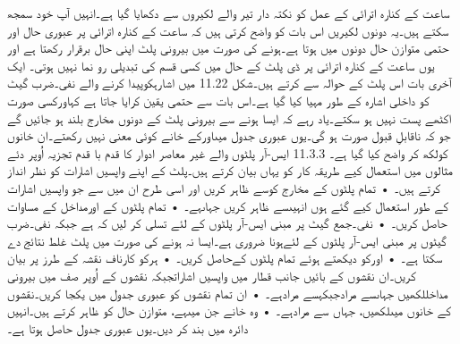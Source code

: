	ساعت کے کنارہ اترائی کے عمل کو نکتہ دار تیر والے لکیروں سے دکھایا گیا ہے۔انہیں آپ خود سمجھ سکتے ہیں۔یہ دونوں لکیریں اس بات کو واضح کرتی ہیں کہ ساعت کے کنارہ اترائی پر عبوری حال اور حتمی متوازن حال دونوں میں ہوتا ہے۔ہونے کی صورت میں بیرونی پلٹ اپنی حال برقرار رکھتا ہے اور یوں ساعت کے کنارہ اترائی پر ڈی پلٹ کے حال میں کسی قسم کی تبدیلی رو نما نہیں ہوتی۔
	ایک آخری بات اس پلٹ کے حوالہ سے کرتے ہیں۔شکل 11.22 میں اشارہکوپیدا کرنے والے نفی۔ضرب گیٹ کو داخلی اشارہ کے طور مہیا کیا گیا ہے۔اس بات سے حتمی یقین کرایا جاتا ہے کہاورکسی صورت اکٹھے پست نہیں ہو سکتے۔یاد رہے کہ ایسا ہونے سے بیرونی پلٹ کے دونوں مخارج بلند ہو جائیں گے جو کہ ناقابلِ قبول صورت ہو گی۔یوں عبوری جدول میںاورکے خانے کوئی معنی نہیں رکھتے۔ان خانوں کولکھ کر واضح کیا گیا ہے۔
11.3.3 ایس-آر پلٹوں والے غیر معاصر ادوار کا قدم با قدم تجزیہ
	اُوپر دئے مثالوں میں استعمال کیے طریقہ کار کو یہاں بیان کرتے ہیں۔پلٹ کے اپنے واپسیں اشارات کو نظر انداز کرتے ہیں۔
    • تمام پلٹوں کے مخارج کوسے ظاہر کریں اور اسی طرح ان میں سے جو واپسیں اشارات کے طور استعمال کیے گئے ہوں انہیںسے ظاہر کریں جہاںہے۔
    • تمام پلٹوں کے اورمداخل کے مساوات حاصل کریں۔
    • نفی۔جمع گیٹ پر مبنی ایس-آر پلٹوں کے لئے تسلی کر لیں کہ ہے جبکہ نفی۔ضرب گیٹوں پر مبنی ایس-آر پلٹوں کے لئےہونا ضروری ہے۔ایسا نہ ہونے کی صورت میں پلٹ غلط نتائج دے سکتا ہے۔
    • اورکو دیکھتے ہوئے تمام پلٹوں کےحاصل کریں۔
    • ہرکو کارناف نقشہ کے طرز پر بیان کریں۔ان نقشوں کے بائیں جانب قطار میں واپسیں اشاراتجبکہ نقشوں کے اُوپر صف میں بیرونی مداخللکھیں جہاںسے مرادجبکہسے مرادہے۔
    • ان تمام نقشوں کو عبوری جدول میں یکجا کریں۔نقشوں کے خانوں میںلکھیں، جہاں سے مرادہے۔
    • وہ خانے جن میںہے، متوازن حال کو ظاہر کرتے ہیں۔انہیں دائرہ میں بند کر دیں۔یوں عبوری جدول حاصل ہوتا ہے۔


